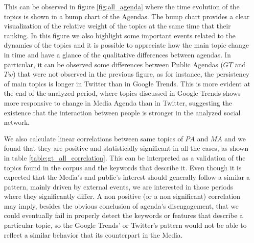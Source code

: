 \documentclass{bmcart}
\begin{document}
\par This can be observed in figure \ref{fig:all_agenda} where the time evolution of the topics is shown in a bump chart of the Agendas. The bump chart provides  a clear visualization of the relative weight of the topics at the same time that their ranking. In  this figure  we also highlight some important events related to the dynamics of the topics and  it is  possible to appreciate how the main topic change in time and have a glance of the qualitative differences between agendas. In particular, it can be observed some differences between Public Agendas ($GT$ and $Tw$) that were not observed in the previous figure, as for instance, the persistency of main topics is longer in Twitter than in Google Trends. This is more evident at the end of the analyzed period, where topics discussed in Google Trends shows more  responsive to change in Media Agenda than in Twitter, suggesting the existence that the interaction between people is stronger in the analyzed social network.


\par We also calculate linear correlations between same topics of $PA$ and $MA$  and we found that they are  positive and statistically significant in all the cases, as shown in table \ref{table:gt_all_correlation}.  This can be interpreted as a validation of the topics found in the corpus and the keywords that describe it. Even though it is expected that the Media's and public's interest should generally follow a similar a pattern, mainly driven by  external events, we are interested in those periods where they significantly differ. 
A non positive (or a non significant) correlation may imply, besides the obvious conclusion of agenda's disengagement, that we could eventually fail in properly detect the keywords or features that describe a particular topic, so the Google Trends' or Twitter's pattern would not be able to reflect a similar behavior that its counterpart in the Media.

\end{document}
